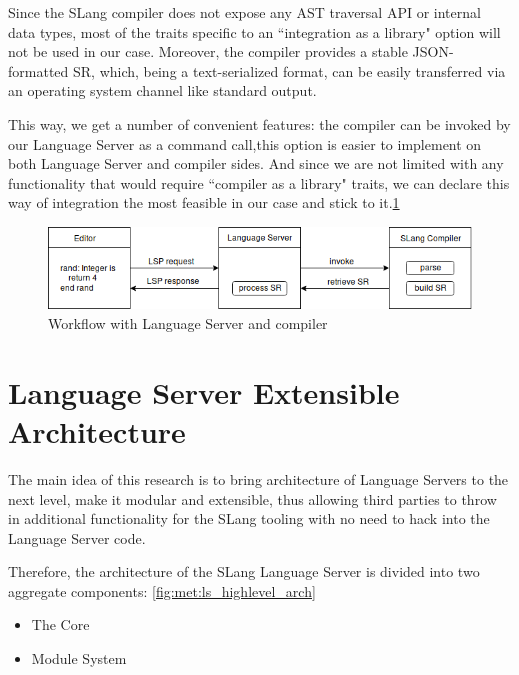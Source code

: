 Since the SLang\cite{Zouev2017} compiler does not expose any AST traversal API or internal data types, most of
the traits specific to an ``integration as a library" option will not be used in our case.
Moreover, the compiler provides a stable JSON-formatted SR, which, being a text-serialized format,
can be easily transferred via an operating system channel like standard output\cite{TheOpenGroup1997}.

This way, we get a number of convenient features: the compiler can be invoked by our Language Server as a command call,this option
is easier to implement on both Language Server and compiler sides.
And since we are not limited with any functionality that would require ``compiler as a library" traits,
we can declare this way of integration the most feasible in our case and stick to it.\ref{fig:met:compiler_integration}

\begin{figure}[H]
    \centering
    \includegraphics[width=1.0\textwidth]{figs/compiler_integration.png}
    \caption{Workflow with Language Server and compiler}
    \label{fig:met:compiler_integration}
\end{figure}

\section{Language Server Extensible Architecture}
\label{sec:met:arch}
The main idea of this research is to bring architecture of Language Servers to the next level,
make it modular and extensible, thus allowing third parties to throw in additional functionality for the SLang tooling
with no need to hack into the Language Server code.

Therefore, the architecture of the SLang Language Server is divided into two aggregate components: \ref{fig:met:ls_highlevel_arch}
\begin{itemize}
    \item The Core
    \item Module System
\end{itemize}

